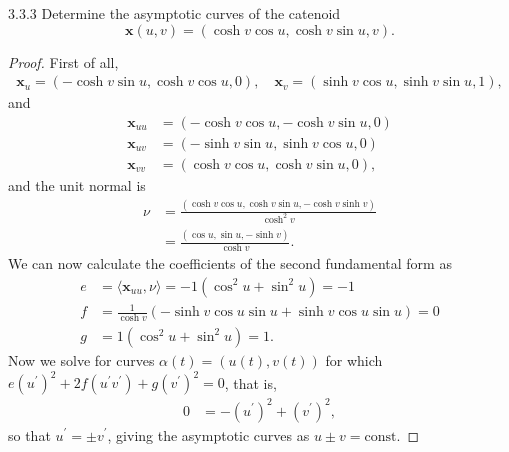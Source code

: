 \documentclass[11pt]{article}
\begin{document}
\begin{problem}{3.3.3}
  Determine the asymptotic curves of the catenoid
  \begin{equation}
  \label{eq:3}
  \mathbf{x}(u,v) = (\cosh v \cos u, \cosh v \sin u, v).
  \end{equation}
\end{problem}
\begin{proof}
  First of all,
  \begin{equation}
  \label{eq:29}
  \begin{aligned}
    \mathbf{x}_u = (-\cosh v \sin u, \cosh v \cos u, 0), \quad \mathbf{x}_v = (\sinh v \cos u, \sinh v \sin u, 1),
  \end{aligned}
\end{equation}
and
\begin{equation}
\label{eq:30}
\begin{aligned}
  \mathbf{x}_{uu} &= (-\cosh v \cos u, -\cosh v \sin u, 0) \\
  \mathbf{x}_{uv} &= (-\sinh v \sin u, \sinh v \cos u, 0) \\
  \mathbf{x}_{vv} &= (\cosh v \cos u, \cosh v \sin u, 0),
\end{aligned}
\end{equation}
and the unit normal is
\begin{equation}
\label{eq:31}
\begin{aligned}
\nu &= \frac{\left( \cosh v \cos u, \cosh v \sin u, -\cosh v \sinh v \right)}{\cosh^2 v} \\
&= \frac{(\cos u, \sin u, -\sinh v)}{\cosh v}.
\end{aligned}
\end{equation}
We can now calculate the coefficients of the second fundamental form as
\begin{equation}
\label{eq:32}
\begin{aligned}
  e &= \langle \mathbf{x}_{uu}, \nu \rangle = -1(\cos^2 u + \sin^2 u) = -1 \\
  f &= \frac{1}{\cosh v}(-\sinh v \cos u \sin u + \sinh v \cos u \sin u) = 0 \\
  g &= 1(\cos^2 u + \sin^2 u) = 1.
\end{aligned}
\end{equation}
Now we solve for curves \(\alpha(t) = (u(t),v(t))\) for which \( e(u^{\prime})^2 + 2f(u^{\prime} v^{\prime}) + g(v^{\prime})^2 = 0 \), that is,
\begin{equation}
\label{eq:33}
\begin{aligned}
0 &= - (u^{\prime})^2 + (v^{\prime})^2,
\end{aligned}
\end{equation}
so that \( u^{\prime} = \pm v^{\prime} \), giving the asymptotic curves as \( u \pm v = \text{const}. \)
\end{proof}
\end{document}
